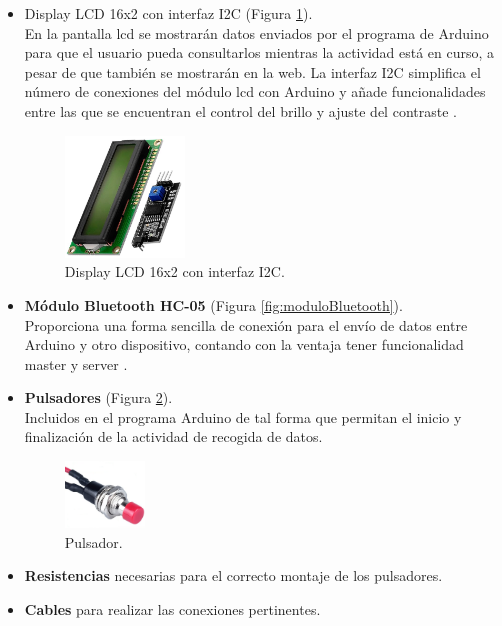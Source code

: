 \begin{itemize}
    \item Display LCD 16x2 con interfaz I2C (Figura \ref{fig:lcd}). \\
    En la pantalla lcd se mostrarán datos enviados por el programa de Arduino para que el usuario pueda consultarlos mientras la actividad está en curso, a pesar de que también se mostrarán en la web. La interfaz I2C simplifica el número de conexiones del módulo lcd con Arduino y añade funcionalidades entre las que se encuentran el control del brillo y ajuste del contraste \cite{16x2LCDd27:online}.
    
    \begin{figure}[h]
        \centering
        \includegraphics[width=0.3\textwidth]{img/4.TecnicasHerramientas/LCDI2C.png}
        \caption{Display LCD 16x2 con interfaz I2C. \cite{lcdFoto88:online}}
        \label{fig:lcd}
    \end{figure}

    \item \textbf{Módulo Bluetooth HC-05} (Figura \ref{fig:moduloBluetooth}). \\
    Proporciona una forma sencilla de conexión para el envío de datos entre Arduino y otro dispositivo, contando con la ventaja tener funcionalidad master y server \cite{Conectar13:online}.
    
    \item \textbf{Pulsadores} (Figura \ref{fig:pulsador}). \\
    Incluidos en el programa Arduino de tal forma que permitan el inicio y finalización de la actividad de recogida de datos.
    
    \begin{figure}[h]
        \centering
        \includegraphics[width=0.2\textwidth]{img/4.TecnicasHerramientas/Pulsador.png}
        \caption{Pulsador. \cite{Pulsador32:online}}
        \label{fig:pulsador}
    \end{figure}
    
    \item \textbf{Resistencias} necesarias para el correcto montaje de los pulsadores.
    
    \item \textbf{Cables} para realizar las conexiones pertinentes.
\end{itemize}

